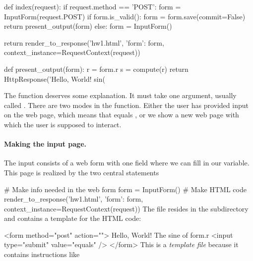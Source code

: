 \documentclass[%
oneside,                 %
final,                   %
10pt]{article}
\begin{document}
{{def index(request):
    if request.method == 'POST':
        form = InputForm(request.POST)
        if form.is_valid():
            form = form.save(commit=False)
            return present_output(form)
    else:
        form = InputForm()

    return render_to_response('hw1.html',
            {'form': form}, context_instance=RequestContext(request))

def present_output(form):
    r = form.r
    s = compute(r)
    return HttpResponse('Hello, World! sin(%
\epypro

The  function deserves some explanation. It must take one
argument, usually called . There are two modes in the function. Either
the user has provided input on the web page, which means that
 equals , or we show a new web page
with which the user is supposed to interact.


\paragraph{Making the input page.}
The input consists of a web form with
one field where we can fill in our  variable. This page
is realized by the two central statements

\bpycod
# Make info needed in the web form
form = InputForm()
# Make HTML code
render_to_response('hw1.html',
    {'form': form}, context_instance=RequestContext(request))
\epycod
The  file resides in the  subdirectory and contains
a template for the HTML code:

\bhtmlpro
<form method="post" action="">{%
    Hello, World! The sine of {{ form.r }}
    <input type="submit" value="equals" />
</form>
\ehtmlpro
This is a \emph{template file} because it contains instructions like
\code{{%
replace the former by some appropriate HTML statements, while the
latter simply extracts the numerical value of the variable \code{r} in
our form (specified in the \code{Input} class in \code{models.py}).
Typically, this \code{hw1.html} file
results in the HTML code

\bhtml
<form method="post" action="">
<div style='display:none'>
<input type='hidden' name='csrfmiddlewaretoken'
value='oPWMuuy1gLlXm9GvUZINv49eVUYnux5Q' /></div>
    Hello, World! The sine of <input type="text" name="r" id="id_r" />
    <input type="submit" value="equals" />
</form>
\ehtml
Figure~\ref{wf:hw1:django:fig:input} shows how the input page looks like in the
web browser.


}}}}}
\end{document}
